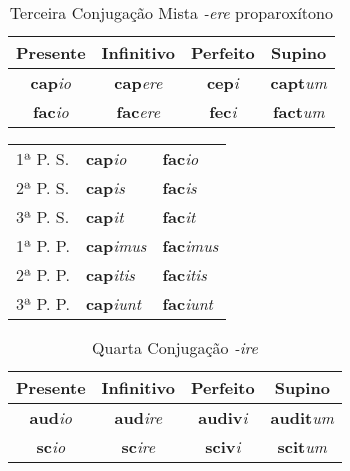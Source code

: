\documentclass{book}
\newcommand{\radicaldesinencia}[2]{\textbf{#1}\textit{#2}}
\begin{document}
\begin{table}
\centering
\caption{Terceira Conjugação Mista \textit{-ere} proparoxítono}
\vspace{0.2cm}
\begin{tabular}{c|c|c|c}
\hline
Presente		&	Infinitivo		&	Perfeito		&	Supino	\\
\hline                                    		
\radicaldesinencia{cap}{io}	&	\radicaldesinencia{cap}{ere}	&	\radicaldesinencia{cep}{i}	&	\radicaldesinencia{capt}{um}	\\
\radicaldesinencia{fac}{io}	&	\radicaldesinencia{fac}{ere}	&	\radicaldesinencia{fec}{i}	&	\radicaldesinencia{fact}{um}	\\
 \hline
\end{tabular}
\end{table}

\begin{table}
\centering
\begin{tabular}{l|l|l}
\hline
1ª P. S.	&  \radicaldesinencia{cap}{io}		& \radicaldesinencia{fac}{io}		\\
2ª P. S.	&  \radicaldesinencia{cap}{is} 	& \radicaldesinencia{fac}{is}		\\
3ª P. S.	&  \radicaldesinencia{cap}{it} 	& \radicaldesinencia{fac}{it}		 \\
\hline
\hline
1ª P. P.	&  \radicaldesinencia{cap}{imus} 	& \radicaldesinencia{fac}{imus}	 \\
2ª P. P. 	&  \radicaldesinencia{cap}{itis} 	& \radicaldesinencia{fac}{itis} 	 \\
3ª P. P.	&  \radicaldesinencia{cap}{iunt} 	& \radicaldesinencia{fac}{iunt}		 \\ 
\hline
\end{tabular}
\end{table}
\clearpage

\begin{table}
\centering
\caption{Quarta Conjugação \textit{-ire} }
\vspace{0.2cm}
\begin{tabular}{c|c|c|c}
\hline
Presente		&	Infinitivo		&	Perfeito		&	Supino	\\
\hline                                    		
\radicaldesinencia{aud}{io}	&	\radicaldesinencia{aud}{ire}	&	\radicaldesinencia{audiv}{i}	&	\radicaldesinencia{audit}{um}	\\
\radicaldesinencia{sc}{io}	&	\radicaldesinencia{sc}{ire}	&	\radicaldesinencia{sciv}{i}	&	\radicaldesinencia{scit}{um}	\\
 \hline
\end{tabular}
\end{table}
\end{document}
